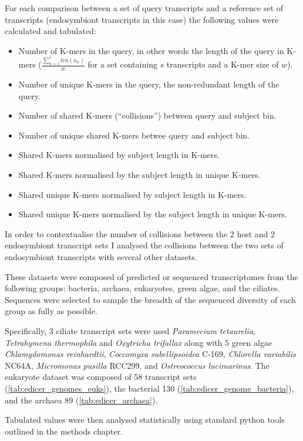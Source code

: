 For each comparison between a set of query transcripts and a reference
set of transcripts (endosymbiont transcripts in this case)
the following
values were calculated and tabulated:
\begin{itemize}
    \item Number of K-mers in the query, in other words the length of the query
        in K-mers (\(\frac{\sum^s_{n=1} len(x_{n})}{w}\)
        for a set containing \(s\) transcripts and a K-mer size of \(w\)).
    \item Number of unique K-mers in the query, the non-redundant length of 
        the query.
    \item Number of shared  K-mers (``collisions'') between query and subject bin.
    \item Number of unique shared K-mers betwee query and subject bin.
    \item Shared K-mers normalised by subject length in K-mers.
    \item Shared K-mers normalised by the subject length in unique K-mers.
    \item Shared unique K-mers normalised by subject length in K-mers.
    \item Shared unique K-mers normalised by the subject length in unique K-mers.
\end{itemize}

In order to contextualise the number of collisions between the 2
host and 2 endosymbiont transcript sets
I analysed the collisions between the two sets of endosymbiont transcripts 
with several other datasets.  

These datasets were composed of predicted or sequenced transcriptomes 
from the following groups: bacteria, 
archaea, eukaryotes, green algae, and the ciliates.
Sequences were selected to sample the breadth of the sequenced
diversity of each group as fully as possible.

Specifically, 3 ciliate transcript sets were used \textit{Paramecium tetaurelia}, 
\textit{Tetrahymena thermophila} and \textit{Oxytricha trifallax} along with
5 green algae \textit{Chlamydomonas reinhardtii}, \textit{Coccomyxa subellipsoidea}
C-169, \textit{Chlorella variabilis} NC64A, \textit{Micromonas pusilla} RCC299, and
\textit{Ostreococcus lucimarinus}.
The eukaryote dataset was composed of 58 transcript
sets (\cref{tab:edicer_genomes_euks}),
the bacterial 130 (\cref{tab:edicer_genome_bacteria}), and 
the archaea 89 (\cref{tab:edicer_archaea}).

Tabulated values were then analysed statistically
using standard python tools outlined in the methods chapter.

